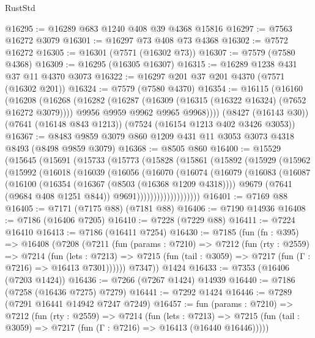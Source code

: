 \begin{lexlean}{RustStd}
\begin{coremodule}
@16295 := @16289 @683 @1240 @408 @39 @4368 @15816
@16297 := @7563 @16272 @3079
@16301 := @16297 @73 @408 @73 @4368
@16302 := @7572 @16272
@16305 := @16301 (@7571 (@16302 @73))
@16307 := @7579 (@7580 @4368)
@16309 := @16295 (@16305 @16307)
@16315 := @16289 @1238 @431 @37 @11 @4370 @3073
@16322 := @16297 @201 @37 @201 @4370 (@7571 (@16302 @201))
@16324 := @7579 (@7580 @4370)
@16354 := @16115
    (@16160
      (@16208
        (@16268
          (@16282
            (@16287 (@16309 (@16315 (@16322 @16324) (@7652 @16272 @3079))))
            @9956
            @9959
            @9962
            @9965
            @9968))))
    (@8427 (@16143 @30))
    (@7641 (@16148 @843 @1213))
    (@7524 (@16154 @1213 @402 @3426 @3053))
@16367 := @8483 @9859 @3079 @860 @1209 @431 @11 @3053 @3073 @4318 @8493 (@8498 @9859 @3079)
@16368 := @8505 @860
@16400 := @15529
    (@15645
      (@15691
        (@15733
          (@15773
            (@15828
              (@15861
                (@15892
                  (@15929
                    (@15962
                      (@15992
                        (@16018
                          (@16039
                            (@16056
                              (@16070
                                (@16074
                                  (@16079
                                    (@16083
                                      (@16087
                                        (@16100
                                          (@16354 (@16367 (@8503 (@16368 @1209 @4318))))
                                          @9679
                                          (@7641 (@9684 @408 @1251 @844))
                                          @9691)))))))))))))))))))
@16401 := @7169 @88
@16405 := @7171 (@7175 @88) (@7181 @88)
@16406 := @7190 @14936
@16408 := @7186 (@16406 @7205)
@16410 := @7228 (@7229 @88)
@16411 := @7224 @16410
@16413 := @7186 (@16411 @7254)
@16430 := @7185
    (fun (fn : @395) =>
    @16408
      (@7208
        (@7211
          (fun (params : @7210) =>
          @7212
            (fun (rty : @2559) =>
            @7214
              (fun (lets : @7213) =>
              @7215 (fun (tail : @3059) => @7217 (fun (Γ : @7216) => @16413 @7301))))))
        @7347))
    @1424
@16433 := @7353 (@16406 (@7203 @1424))
@16436 := @7266 (@7267 @1424) @14939
@16440 := @7186 (@7258 (@16436 @7275) @7279)
@16441 := @7292 @1424
@16446 := @7289 (@7291 @16441 @14942 @7247 @7249)
@16457 := fun (params : @7210) =>
  @7212
    (fun (rty : @2559) =>
    @7214
      (fun (lets : @7213) =>
      @7215 (fun (tail : @3059) => @7217 (fun (Γ : @7216) => @16413 (@16440 @16446)))))

\end{coremodule}
\end{lexlean}
